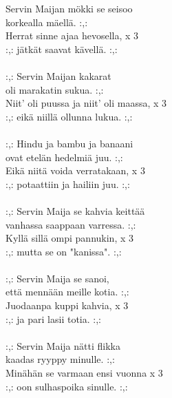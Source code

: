 Servin Maijan mökki se seisoo  \\ korkealla mäellä. :,: \\ Herrat sinne ajaa hevosella,  x 3 \\ :,: jätkät saavat kävellä. :,:  \\ \hspace{10mm} \\ :,: Servin Maijan kakarat  \\ oli marakatin sukua. :,: \\ Niit' oli puussa ja niit' oli maassa,  x 3 \\ :,: eikä niillä ollunna lukua. :,:  \\ \hspace{10mm} \\ :,: Hindu ja bambu ja banaani  \\ ovat etelän hedelmiä juu. :,: \\ Eikä niitä voida verratakaan,  x 3 \\ :,: potaattiin ja hailiin juu. :,:  \\ \hspace{10mm} \\ :,: Servin Maija se kahvia keittää  \\ vanhassa saappaan varressa. :,: \\ Kyllä sillä ompi pannukin,  x 3 \\ :,: mutta se on "kanissa". :,: \\ \hspace{10mm} \\ :,: Servin Maija se sanoi,  \\ että mennään meille kotia. :,: \\ Juodaanpa kuppi kahvia,  x 3 \\ :,: ja pari lasii totia. :,: \\ \hspace{10mm} \\ :,: Servin Maija nätti flikka  \\ kaadas ryyppy minulle. :,: \\ Minähän se varmaan ensi vuonna  x 3 \\ :,: oon sulhaspoika sinulle. :,: \\ 